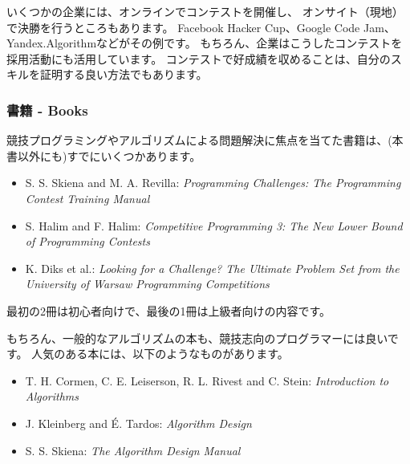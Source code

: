 いくつかの企業には、オンラインでコンテストを開催し、
オンサイト（現地）で決勝を行うところもあります。
Facebook Hacker Cup、Google Code Jam、Yandex.Algorithmなどがその例です。
もちろん、企業はこうしたコンテストを採用活動にも活用しています。
コンテストで好成績を収めることは、自分のスキルを証明する良い方法でもあります。

\subsubsection{書籍 - Books}

競技プログラミングやアルゴリズムによる問題解決に焦点を当てた書籍は、(本書以外にも)すでにいくつかあります。

\begin{itemize}
\item S. S. Skiena and M. A. Revilla:
\emph{Programming Challenges: The Programming Contest Training Manual} \cite{ski03}
\item S. Halim and F. Halim:
\emph{Competitive Programming 3: The New Lower Bound of Programming Contests} \cite{hal13}
\item K. Diks et al.: \emph{Looking for a Challenge? The Ultimate Problem Set from
the University of Warsaw Programming Competitions} \cite{dik12}
\end{itemize}

最初の2冊は初心者向けで、最後の1冊は上級者向けの内容です。

もちろん、一般的なアルゴリズムの本も、競技志向のプログラマーには良いです。
人気のある本には、以下のようなものがあります。

\begin{itemize}
\item T. H. Cormen, C. E. Leiserson, R. L. Rivest and C. Stein:
\emph{Introduction to Algorithms} \cite{cor09}
\item J. Kleinberg and É. Tardos:
\emph{Algorithm Design} \cite{kle05}
\item S. S. Skiena:
\emph{The Algorithm Design Manual} \cite{ski08}
\end{itemize}
